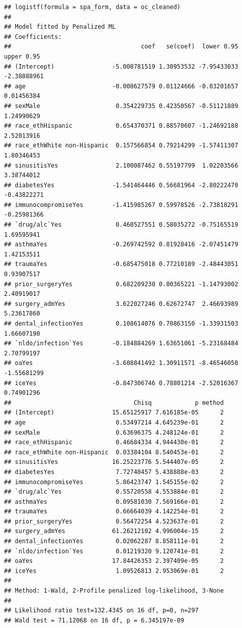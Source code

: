 \documentclass[
]{article}
\begin{document}
\begin{verbatim}
## logistf(formula = spa_form, data = oc_cleaned)
## 
## Model fitted by Penalized ML
## Coefficients:
##                                    coef   se(coef)  lower 0.95  upper 0.95
## (Intercept)                -5.008781519 1.30953532 -7.95433033 -2.38888961
## age                        -0.008627579 0.01124666 -0.03201657  0.01456384
## sexMale                     0.354229735 0.42350567 -0.51121889  1.24990629
## race_ethHispanic            0.654370371 0.88570607 -1.24692188  2.52013916
## race_ethWhite non-Hispanic  0.157566854 0.79214299 -1.57411307  1.80346453
## sinusitisYes                2.100087462 0.55197799  1.02203566  3.38744012
## diabetesYes                -1.541464446 0.56681964 -2.80222470 -0.43822271
## immunocompromiseYes        -1.415985267 0.59978526 -2.73818291 -0.25981366
## `drug/alc`Yes               0.460527551 0.58035272 -0.75165519  1.69595941
## asthmaYes                  -0.269742592 0.81928416 -2.07451479  1.42153511
## traumaYes                  -0.685475018 0.77210189 -2.48443051  0.93907517
## prior_surgeryYes            0.682209230 0.80365221 -1.14793002  2.40919017
## surgery_admYes              3.622027246 0.62672747  2.46693989  5.23617860
## dental_infectionYes         0.108614076 0.70863150 -1.33931503  1.66607190
## `nldo/infection`Yes        -0.184884269 1.63651061 -5.23168484  2.70799197
## oaYes                      -3.608841492 1.30911571 -8.46546058 -1.55681299
## iceYes                     -0.847306746 0.78801214 -2.52016367  0.74901296
##                                  Chisq            p method
## (Intercept)                15.65125917 7.616185e-05      2
## age                         0.53497214 4.645239e-01      2
## sexMale                     0.63696375 4.248124e-01      2
## race_ethHispanic            0.46684334 4.944430e-01      2
## race_ethWhite non-Hispanic  0.03384104 8.540453e-01      2
## sinusitisYes               16.25223776 5.544407e-05      2
## diabetesYes                 7.72740457 5.438888e-03      2
## immunocompromiseYes         5.86423747 1.545155e-02      2
## `drug/alc`Yes               0.55720558 4.553884e-01      2
## asthmaYes                   0.09581030 7.569166e-01      2
## traumaYes                   0.66664039 4.142254e-01      2
## prior_surgeryYes            0.56472254 4.523637e-01      2
## surgery_admYes             61.26212102 4.996004e-15      2
## dental_infectionYes         0.02062287 8.858111e-01      2
## `nldo/infection`Yes         0.01219320 9.120741e-01      2
## oaYes                      17.84426353 2.397409e-05      2
## iceYes                      1.09526813 2.953069e-01      2
## 
## Method: 1-Wald, 2-Profile penalized log-likelihood, 3-None
## 
## Likelihood ratio test=132.4345 on 16 df, p=0, n=297
## Wald test = 71.12068 on 16 df, p = 6.345197e-09
\end{verbatim}
\end{document}
